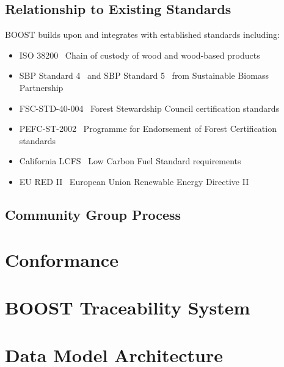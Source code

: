 \documentclass[12pt,a4paper]{article}
\begin{document}
\subsection{Relationship to Existing Standards}
\label{sec:existing-standards}

BOOST builds upon and integrates with established standards including:
\begin{itemize}
    \item ISO 38200~\cite{ISO38200} Chain of custody of wood and wood-based products
    \item SBP Standard 4~\cite{SBP-STANDARD-4} and SBP Standard 5~\cite{SBP-STANDARD-5} from Sustainable Biomass Partnership
    \item FSC-STD-40-004~\cite{FSC-STD-40-004} Forest Stewardship Council certification standards
    \item PEFC-ST-2002~\cite{PEFC-ST-2002} Programme for Endorsement of Forest Certification standards
    \item California LCFS~\cite{CA-LCFS} Low Carbon Fuel Standard requirements
    \item EU RED II~\cite{EU-RED-II} European Union Renewable Energy Directive II
\end{itemize}

\subsection{Community Group Process}
\label{sec:community-process}


\section{Conformance}
\label{sec:conformance}


\section{BOOST Traceability System}
\label{sec:traceability-system}


\section{Data Model Architecture}
\label{sec:data-model}


\end{document}
